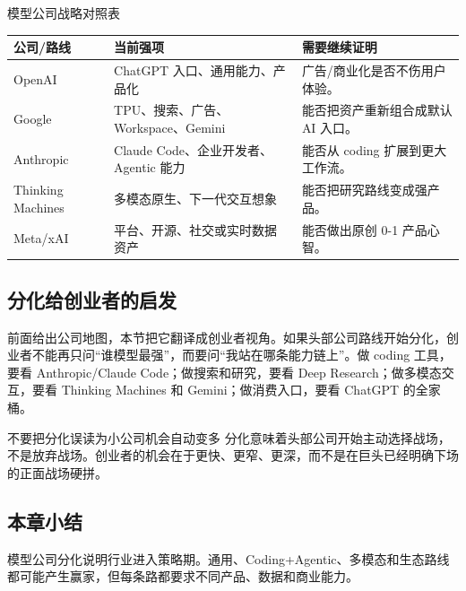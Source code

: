 \begin{knowledgebox}{模型公司战略对照表}
\begin{tabularx}{\textwidth}{p{}p{}p{}}
\toprule
公司/路线 & 当前强项 & 需要继续证明 \\
\midrule
OpenAI & ChatGPT 入口、通用能力、产品化 & 广告/商业化是否不伤用户体验。 \\
Google & TPU、搜索、广告、Workspace、Gemini & 能否把资产重新组合成默认 AI 入口。 \\
Anthropic & Claude Code、企业开发者、Agentic 能力 & 能否从 coding 扩展到更大工作流。 \\
Thinking Machines & 多模态原生、下一代交互想象 & 能否把研究路线变成强产品。 \\
Meta/xAI & 平台、开源、社交或实时数据资产 & 能否做出原创 0-1 产品心智。 \\
\bottomrule
\end{tabularx}
\end{knowledgebox}

\subsection{分化给创业者的启发}

前面给出公司地图，本节把它翻译成创业者视角。如果头部公司路线开始分化，创业者不能再只问“谁模型最强”，而要问“我站在哪条能力链上”。做 coding 工具，要看 Anthropic/Claude Code；做搜索和研究，要看 Deep Research；做多模态交互，要看 Thinking Machines 和 Gemini；做消费入口，要看 ChatGPT 的全家桶。

\begin{warningbox}{不要把分化误读为小公司机会自动变多}
分化意味着头部公司开始主动选择战场，不是放弃战场。创业者的机会在于更快、更窄、更深，而不是在巨头已经明确下场的正面战场硬拼。
\end{warningbox}

\subsection{本章小结}

模型公司分化说明行业进入策略期。通用、Coding+Agentic、多模态和生态路线都可能产生赢家，但每条路都要求不同产品、数据和商业能力。


